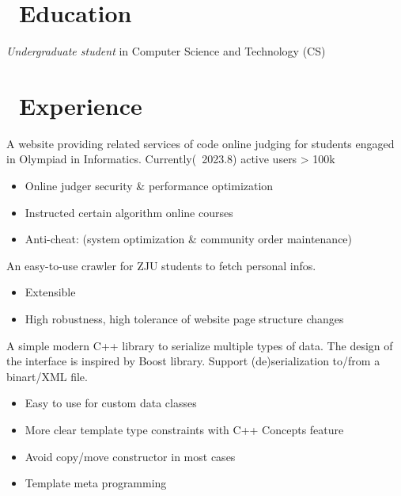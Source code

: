 \documentclass{resume}
\begin{document}



\section{\faGraduationCap\ Education}
\textit{Undergraduate student} in Computer Science and Technology (CS)

\section{\faUsers\ Experience}
A website providing related services of code online judging for students engaged in Olympiad in Informatics.  
Currently(~2023.8) active users > 100k
\begin{itemize}
  \item Online judger security & performance optimization
  \item Instructed certain algorithm online courses
  \item Anti-cheat: (system optimization & community order maintenance)
\end{itemize}

An easy-to-use crawler for ZJU students to fetch personal infos.  
\begin{itemize}
  \item Extensible
  \item High robustness, high tolerance of website page structure changes
\end{itemize}

A simple modern C++ library to serialize multiple types of data. The design of the interface is inspired by Boost library.
Support (de)serialization to/from a binart/XML file.
\begin{itemize}
  \item Easy to use for custom data classes
  \item More clear template type constraints with C++ Concepts feature
  \item Avoid copy/move constructor in most cases
  \item Template meta programming
\end{itemize}
\end{document}
